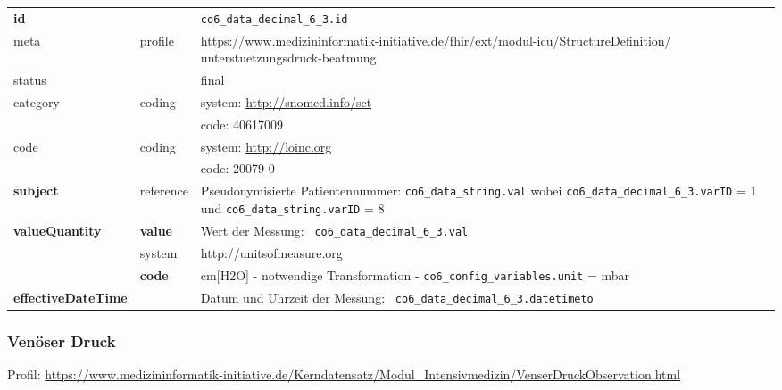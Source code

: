 \begin{longtable}{|l|l|p{7.5cm}|}
	\hline
	\rowcolor{lightgray} \multicolumn{3}{|l|}{Data Mapping (inhaltlich)} \\ \hline
	\textbf{id} &  & \texttt{co6\_data\_decimal\_6\_3.id} \\ \hline
	meta & profile & https://www.medizininformatik-initiative.de/fhir/ext/modul-icu/StructureDefinition/
	unterstuetzungsdruck-beatmung \\ \hline 
	status &  & final   \\ \hline 
	category & coding & system: \url{http://snomed.info/sct} \\
	\cline{3-3}
	& & code: 40617009 \\ \hline
	code & coding & system: \url{http://loinc.org} \\ 
	\cline{3-3} 
	&  & code: 20079-0 \\  \hline
	\textbf{subject} & reference & Pseudonymisierte Patientennummer: \texttt{co6\_data\_string.val} wobei \texttt{co6\_data\_decimal\_6\_3.varID} = 1 und \texttt{co6\_data\_string.varID} = 8 \\ \hline
	\textbf{valueQuantity}  & \textbf{value} & Wert der Messung: \texttt{
		co6\_data\_decimal\_6\_3.val} \\
	\cline{2-3}
	& system & http://unitsofmeasure.org \\
	\cline{2-3}
	& \textbf{code} & cm[H2O] - notwendige Transformation - \texttt{co6\_config\_variables.unit} = mbar
	\\ \hline
	\textbf{effectiveDateTime}  & & Datum und Uhrzeit der Messung: \texttt{
		co6\_data\_decimal\_6\_3.datetimeto} \\
	\hline
\end{longtable}

\subsubsection{Venöser Druck} 

Profil: \url{https://www.medizininformatik-initiative.de/Kerndatensatz/Modul_Intensivmedizin/VenserDruckObservation.html}

